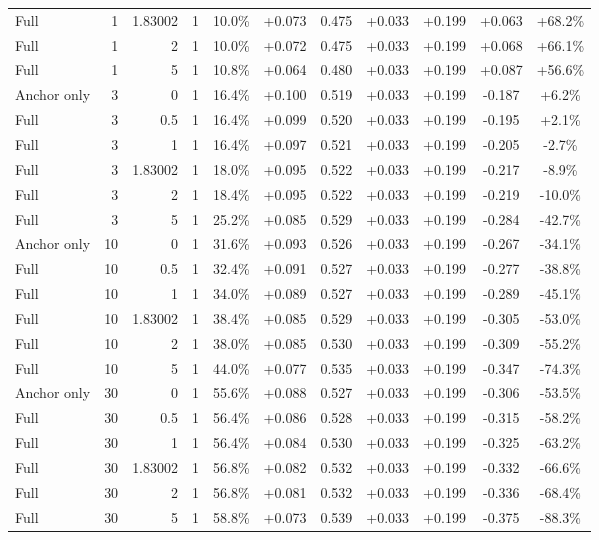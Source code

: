 \begin{table}[htbp]
\begin{tabular}{lrrrccccccc}
Full & 1 & 1.83002 & 1 & 10.0\% & +0.073 & 0.475 & +0.033 & +0.199 & +0.063 & +68.2\% \\
Full & 1 & 2 & 1 & 10.0\% & +0.072 & 0.475 & +0.033 & +0.199 & +0.068 & +66.1\% \\
Full & 1 & 5 & 1 & 10.8\% & +0.064 & 0.480 & +0.033 & +0.199 & +0.087 & +56.6\% \\
Anchor only & 3 & 0 & 1 & 16.4\% & +0.100 & 0.519 & +0.033 & +0.199 & -0.187 & +6.2\% \\
Full & 3 & 0.5 & 1 & 16.4\% & +0.099 & 0.520 & +0.033 & +0.199 & -0.195 & +2.1\% \\
Full & 3 & 1 & 1 & 16.4\% & +0.097 & 0.521 & +0.033 & +0.199 & -0.205 & -2.7\% \\
Full & 3 & 1.83002 & 1 & 18.0\% & +0.095 & 0.522 & +0.033 & +0.199 & -0.217 & -8.9\% \\
Full & 3 & 2 & 1 & 18.4\% & +0.095 & 0.522 & +0.033 & +0.199 & -0.219 & -10.0\% \\
Full & 3 & 5 & 1 & 25.2\% & +0.085 & 0.529 & +0.033 & +0.199 & -0.284 & -42.7\% \\
Anchor only & 10 & 0 & 1 & 31.6\% & +0.093 & 0.526 & +0.033 & +0.199 & -0.267 & -34.1\% \\
Full & 10 & 0.5 & 1 & 32.4\% & +0.091 & 0.527 & +0.033 & +0.199 & -0.277 & -38.8\% \\
Full & 10 & 1 & 1 & 34.0\% & +0.089 & 0.527 & +0.033 & +0.199 & -0.289 & -45.1\% \\
Full & 10 & 1.83002 & 1 & 38.4\% & +0.085 & 0.529 & +0.033 & +0.199 & -0.305 & -53.0\% \\
Full & 10 & 2 & 1 & 38.0\% & +0.085 & 0.530 & +0.033 & +0.199 & -0.309 & -55.2\% \\
Full & 10 & 5 & 1 & 44.0\% & +0.077 & 0.535 & +0.033 & +0.199 & -0.347 & -74.3\% \\
Anchor only & 30 & 0 & 1 & 55.6\% & +0.088 & 0.527 & +0.033 & +0.199 & -0.306 & -53.5\% \\
Full & 30 & 0.5 & 1 & 56.4\% & +0.086 & 0.528 & +0.033 & +0.199 & -0.315 & -58.2\% \\
Full & 30 & 1 & 1 & 56.4\% & +0.084 & 0.530 & +0.033 & +0.199 & -0.325 & -63.2\% \\
Full & 30 & 1.83002 & 1 & 56.8\% & +0.082 & 0.532 & +0.033 & +0.199 & -0.332 & -66.6\% \\
Full & 30 & 2 & 1 & 56.8\% & +0.081 & 0.532 & +0.033 & +0.199 & -0.336 & -68.4\% \\
Full & 30 & 5 & 1 & 58.8\% & +0.073 & 0.539 & +0.033 & +0.199 & -0.375 & -88.3\% \\

\end{tabular}
\end{table}
